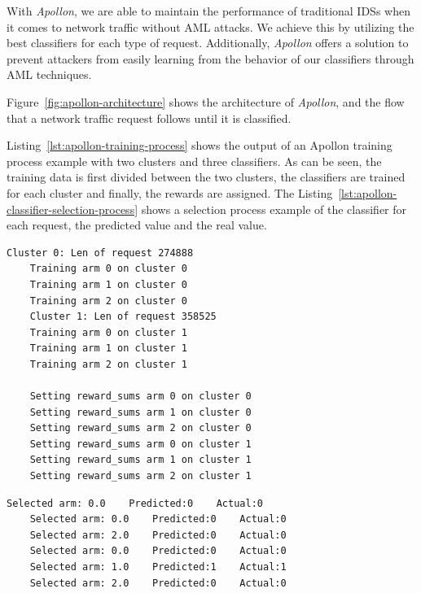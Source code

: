 With \textit{Apollon}, we are able to maintain the performance of traditional IDSs when it comes to network traffic without
AML attacks.
We achieve this by utilizing the best classifiers for each type of request.
Additionally, \textit{Apollon} offers a solution to prevent attackers from easily learning from the behavior of our classifiers
through AML techniques.

Figure~\ref{fig:apollon-architecture} shows the architecture of \textit{Apollon}, and the flow that a network traffic request
follows until it is classified.

Listing~\ref{lst:apollon-training-process} shows the output of an Apollon training process example with two clusters and three
classifiers.
As can be seen, the training data is first divided between the two clusters, the classifiers are trained for each cluster and
finally, the rewards are assigned.
The Listing~\ref{lst:apollon-classifier-selection-process} shows a selection process example of the classifier for each request,
the predicted value and the real value.

\begin{lstlisting}[caption={Apollon training process example}, label={lst:apollon-training-process}, frame=single, captionpos=b, basicstyle=\fontsize{9}{11}\selectfont\ttfamily]
    Cluster 0: Len of request 274888
    Training arm 0 on cluster 0
    Training arm 1 on cluster 0
    Training arm 2 on cluster 0
    Cluster 1: Len of request 358525
    Training arm 0 on cluster 1
    Training arm 1 on cluster 1
    Training arm 2 on cluster 1

    Setting reward_sums arm 0 on cluster 0
    Setting reward_sums arm 1 on cluster 0
    Setting reward_sums arm 2 on cluster 0
    Setting reward_sums arm 0 on cluster 1
    Setting reward_sums arm 1 on cluster 1
    Setting reward_sums arm 2 on cluster 1
\end{lstlisting}

\begin{lstlisting}[caption={Apollon classifier selection process example}, label={lst:apollon-classifier-selection-process}, frame=single, captionpos=b, basicstyle=\fontsize{9}{11}\selectfont\ttfamily]
    Selected arm: 0.0    Predicted:0    Actual:0
    Selected arm: 0.0    Predicted:0    Actual:0
    Selected arm: 2.0    Predicted:0    Actual:0
    Selected arm: 0.0    Predicted:0    Actual:0
    Selected arm: 1.0    Predicted:1    Actual:1
    Selected arm: 2.0    Predicted:0    Actual:0
\end{lstlisting}

